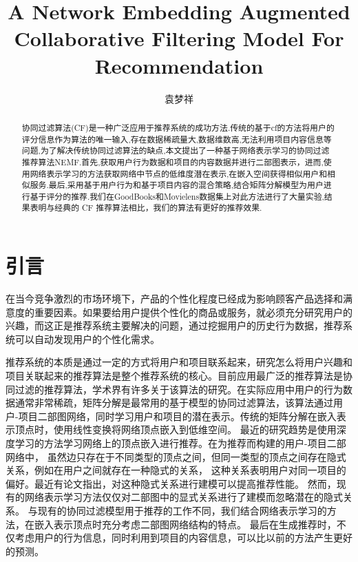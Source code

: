 \documentclass[lang=cn,11pt]{elegantpaper}
\title{A Network Embedding Augmented Collaborative Filtering Model For Recommendation}
\author{袁梦祥}
\institute{安徽大学大数据与云服务工程实验室}
\date{}
\begin{document}
\maketitle

\begin{abstract}
	

	
\noindent 协同过滤算法(CF)是一种广泛应用于推荐系统的成功方法.传统的基于cf的方法将用户的评分信息作为算法的唯一输入,存在数据稀疏量大,数据维数高,无法利用项目内容信息等问题,为了解决传统协同过滤算法的缺点,本文提出了一种基于网络表示学习的协同过滤推荐算法NEMF.首先,获取用户行为数据和项目的内容数据并进行二部图表示，进而,使用网络表示学习的方法获取网络中节点的低维度潜在表示,在嵌入空间获得相似用户和相似服务.最后,采用基于用户行为和基于项目内容的混合策略,结合矩阵分解模型为用户进行基于评分的推荐.我们在GoodBooks和Movielens数据集上对此方法进行了大量实验,结果表明与经典的 CF 推荐算法相比，我们的算法有更好的推荐效果.

\end{abstract}


\section{引言}

在当今竞争激烈的市场环境下，产品的个性化程度已经成为影响顾客产品选择和满意度的重要因素。如果要给用户提供个性化的商品或服务，就必须充分研究用户的兴趣，而这正是推荐系统主要解决的问题，通过挖掘用户的历史行为数据，推荐系统可以自动发现用户的个性化需求。

推荐系统的本质是通过一定的方式将用户和项目联系起来，研究怎么将用户兴趣和项目关联起来的推荐算法是整个推荐系统的核心。目前应用最广泛的推荐算法是协同过滤的推荐算法，学术界有许多关于该算法的研究\cite{Linden2003,Miranda2009,Sarwar2001a,Su2009}。在实际应用中用户的行为数据通常非常稀疏，矩阵分解是最常用的基于模型的协同过滤算法\cite{Salakhutdinov2007,Koren2009}，该算法通过用户-项目二部图网络，同时学习用户和项目的潜在表示。传统的矩阵分解在嵌入表示顶点时，使用线性变换将网络顶点嵌入到低维空间。
最近的研究趋势是使用深度学习的方法学习网络上的顶点嵌入\cite{He2017}进行推荐。在为推荐而构建的用户-项目二部网络中，
虽然边只存在于不同类型的顶点之间，但同一类型的顶点之间存在隐式关系，例如在用户之间就存在一种隐式的关系，
这种关系表明用户对同一项目的偏好。最近有论文指出，对这种隐式关系进行建模可以提高推荐性能\cite{Yu2018}。
然而，现有的网络表示学习方法\cite{Perozzi2014,Grover2016,Tang2015}仅仅对二部图中的显式关系进行了建模而忽略潜在的隐式关系。
与现有的协同过滤模型用于推荐的工作不同，我们结合网络表示学习的方法，在嵌入表示顶点时充分考虑二部图网络结构的特点。
最后在生成推荐时，不仅考虑用户的行为信息，同时利用到项目的内容信息，可以比以前的方法产生更好的预测。
\end{document}
